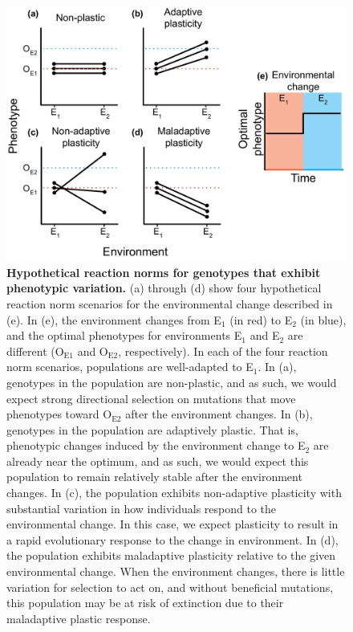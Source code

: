 \begin{figure}[ht!]
    \centering
    \includegraphics[width=\textwidth]{media/reaction-norms.pdf}
    \caption{\small
    \textbf{Hypothetical reaction norms for genotypes that exhibit phenotypic variation.}
    (a) through (d) show four hypothetical reaction norm scenarios for the environmental change described in (e).  
    In (e), the environment changes from E$_1$ (in red) to E$_2$ (in blue), and the optimal phenotypes for environments E$_1$ and E$_2$ are different (O$_{\text{E}1}$ and O$_{\text{E}2}$, respectively).
    In each of the four reaction norm scenarios, populations are well-adapted to E$_1$.
    In (a), genotypes in the population are non-plastic, and as such, we would expect strong directional selection on mutations that move phenotypes toward O$_{\text{E}2}$ after the environment changes.
    In (b), genotypes in the population are adaptively plastic. 
    That is, phenotypic changes induced by the environment change to E$_2$ are already near the optimum, and as such, we would expect this population to remain relatively stable after the environment changes.
    In (c), the population exhibits non-adaptive plasticity with substantial variation in how individuals respond to the environmental change. 
    In this case, we expect plasticity to result in a rapid evolutionary response to the change in environment.  
    In (d), the population exhibits maladaptive plasticity relative to the given environmental change. 
    When the environment changes, there is little variation for selection to act on, and without beneficial mutations, this population may be at risk of extinction due to their maladaptive plastic response.
    }
    \label{fig:reaction-norms}
\end{figure}

